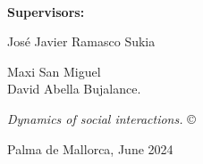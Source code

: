 \documentclass[
	11pt, %
	a4paper,
]{LegrandOrangeBook}
\begin{document}
 








\thispagestyle{empty} %

~\vfill %
\sffamily

\noindent \textbf{Supervisors:}

\noindent Jos\'e Javier Ramasco Sukia

\noindent Maxi San Miguel \\

\noindent David Abella Bujalance.

\noindent \textit{Dynamics of social interactions.} \copyright

\noindent Palma de Mallorca, June 2024
\pagebreak


\newpage
\thispagestyle{plain} %
\mbox{}


\newpage
\thispagestyle{plain} %
\mbox{}

\newpage
\thispagestyle{plain} %
\mbox{}

\end{document}
